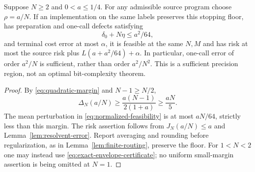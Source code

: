 \begin{corollary}\label{cor:normalized-precision}
Suppose $N\ge2$ and $0<a\le1/4$. For any admissible source program choose $\rho=a/N$. If an implementation on the same labels preserves this stopping floor, has preparation and one-call defects satisfying
\begin{equation}\label{eq:precision-allocation}
 \delta_0+N\eta\le a^2/64,
\end{equation}
and terminal cost error at most $\alpha$, it is feasible at the same $N,M$ and has risk at most the source risk plus
$L(a+a^2/64)+\alpha$.
In particular, one-call error of order $a^2/N$ is sufficient, rather than order $a^2/N^2$. This is a sufficient precision region, not an optimal bit-complexity theorem.
\end{corollary}
\begin{proof}
By \eqref{eq:quadratic-margin} and $N-1\ge N/2$,
\[
 \Delta_N(a/N)\ge\frac{a(N-1)}{2(1+a)}\ge\frac{aN}{5}.
\]
The mean perturbation in \eqref{eq:normalized-feasibility} is at most $aN/64$, strictly less than this margin. The risk assertion follows from $J_N(a/N)\le a$ and Lemma~\ref{lem:resolvent-error}. Report averaging and rounding before regularization, as in Lemma~\ref{lem:finite-routing}, preserve the floor. For $1<N<2$ one may instead use \eqref{eq:exact-envelope-certificate}; no uniform small-margin assertion is being omitted at $N=1$.
\end{proof}
